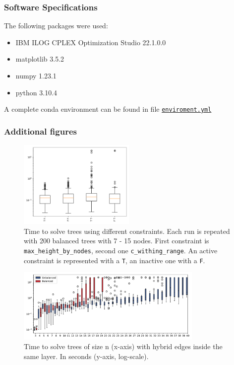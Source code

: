 \documentclass{article}
\begin{document}
\subsubsection*{Software Specifications}
The following packages were used:
\begin{itemize}
    \item IBM ILOG CPLEX Optimization Studio 22.1.0.0 \cite{ibm-cplex}
    \item matplotlib 3.5.2 \cite{matplotlib}
    \item numpy 1.23.1 \cite{numpy}
    \item python 3.10.4 \cite{python}
\end{itemize}
A complete conda environment can be found in file \href{https://github.com/not-a-feature/Layouting-Phylogenetic-Networks-using-MIQP/blob/main/enviroment.yml}{\texttt{enviroment.yml}}
\newpage
\subsubsection*{Additional figures}
 \begin{figure}[H]
     \centering
     \includegraphics[width=0.5\textwidth]{figures/01_grid.pdf}
     \caption{Time to solve trees using different constraints. Each run is repeated with 200 balanced trees with 7 - 15 nodes. First constraint is \texttt{max\_height\_by\_nodes}, second one \texttt{c\_withing\_range}. An active constraint is represented with a \texttt{T}, an inactive one with a \texttt{F}.}
     \label{fig:01_gridsearch}
 \end{figure}

 \begin{figure}[H]
    \centering
    \includegraphics[width=0.8\textwidth]{figures/02_perf.pdf}
    \caption{Time to solve trees of size n (x-axis) with hybrid edges inside the same layer. In seconds (y-axis, log-scale).}
    \label{fig:runtime-horiz-hybrid}
\end{figure}
\end{document}

